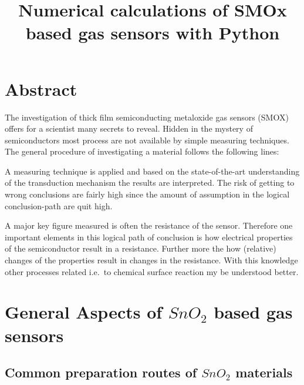 \documentclass[11pt]{article}
\title{Numerical calculations of SMOx based gas sensors with Python}
\begin{document}
    
    \maketitle
    
    

    
    \tableofcontents 
\setcounter{section}{0}

    \hypertarget{abstract}{%
\section{Abstract}\label{abstract}}

The investigation of thick film semiconducting metaloxide gas sensors
(SMOX) offers for a scientist many secrets to reveal. Hidden in the
mystery of semiconductors most process are not available by simple
measuring techniques. The general procedure of investigating a material
follows the following lines:

A measuring technique is applied and based on the state-of-the-art
understanding of the transduction mechanism the results are interpreted.
The risk of getting to wrong conclusions are fairly high since the
amount of assumption in the logical conclusion-path are quit high.

A major key figure measured is often the resistance of the sensor.
Therefore one important elements in this logical path of conclusion is
how electrical properties of the semiconductor result in a resistance.
Further more the how (relative) changes of the properties result in
changes in the resistance. With this knowledge other processes related
i.e.~to chemical surface reaction my be understood better.

    \hypertarget{general-aspects-of-sno_2-based-gas-sensors}{%
\section{\texorpdfstring{General Aspects of \(SnO_2\) based gas
sensors}{General Aspects of SnO\_2 based gas sensors}}\label{general-aspects-of-sno_2-based-gas-sensors}}

\hypertarget{common-preparation-routes-of-sno_2-materials}{%
\subsection{\texorpdfstring{Common preparation routes of \(SnO_{2}\)
materials}{Common preparation routes of SnO\_\{2\} materials}}\label{common-preparation-routes-of-sno_2-materials}}
\end{document}
